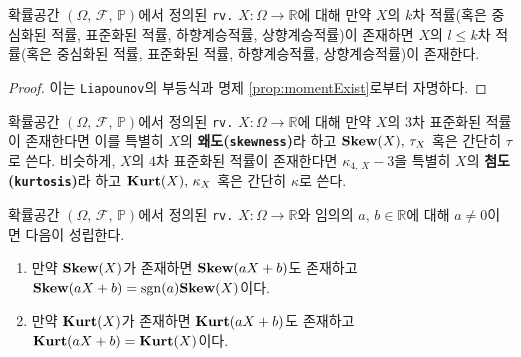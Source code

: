 \begin{proposition}
    확률공간 $(\Omega,\,\mathcal{F},\,\mathbb{P})$에서 정의된 \texttt{rv.} $X:\Omega\to\mathbb{R}$에 대해 만약 $X$의 $k$차 적률(혹은 중심화된 적률, 표준화된 적률, 하향계승적률, 상향계승적률)이 존재하면 $X$의 $l\leq k$차 적률(혹은 중심화된 적률, 표준화된 적률, 하향계승적률, 상향계승적률)이 존재한다.
\end{proposition}

\begin{proof}
    이는 \texttt{Liapounov}의 부등식과 명제 \ref{prop:momentExist}로부터 자명하다.
\end{proof}

\begin{definition}
    확률공간 $(\Omega,\,\mathcal{F},\,\mathbb{P})$에서 정의된 \texttt{rv.} $X:\Omega\to\mathbb{R}$에 대해 만약 $X$의 $3$차 표준화된 적률이 존재한다면 이를 특별히 $X$의 \textbf{왜도(\texttt{skewness})}라 하고 $\mathbf{Skew}(X),\,\tau_X$ 혹은 간단히 $\tau$로 쓴다. 비슷하게, $X$의 $4$차 표준화된 적률이 존재한다면 $\kappa_{4,\,X}-3$을 특별히 $X$의 \textbf{첨도(\texttt{kurtosis})}라 하고 $\mathbf{Kurt}(X),\,\kappa_X$ 혹은 간단히 $\kappa$로 쓴다.
\end{definition}

\begin{theorem}
    확률공간 $(\Omega,\,\mathcal{F},\,\mathbb{P})$에서 정의된 \texttt{rv.} $X:\Omega\to\mathbb{R}$와 임의의 $a,\,b\in\mathbb{R}$에 대해 $a\ne0$이면 다음이 성립한다.
    \begin{enumerate}
        \item 만약 $\mathbf{Skew}(X)$가 존재하면 $\mathbf{Skew}(aX+b)$도 존재하고 $\mathbf{Skew}(aX+b)=\mathrm{sgn}(a)\mathbf{Skew}(X)$이다.
        \item 만약 $\mathbf{Kurt}(X)$가 존재하면 $\mathbf{Kurt}(aX+b)$도 존재하고 $\mathbf{Kurt}(aX+b)=\mathbf{Kurt}(X)$이다.
    \end{enumerate}
\end{theorem}

